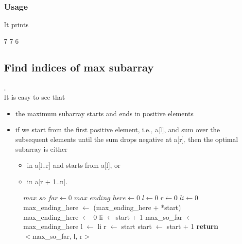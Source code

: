 \subsubsection{Usage}

It prints 
\begin{boxedverbatim}
7
7
6
\end{boxedverbatim}

\subsection{Find indices of max subarray}
\qquad {}.
\vspace{1mm}\\
It is easy to see that 
\begin{itemize}
    \item the maximum subarray  starts and ends in positive elements
    \item if we start from the first positive element, i.e., a[l], and sum over the subsequent elements until the sum drops negative at a[r], then the optimal subarray is either
    \begin{itemize}
        \item in a[l..r] and starts from a[l], or 
        \item in a[r + 1..n].
    \end{itemize}
\end{itemize}

\begin{figure}[H]
\begin{center}
\end{center}
\begin{algorithmic}[1]
    \State $max\_so\_far \gets 0$
    \State $max\_ending\_here \gets 0$
    \State $l \gets 0$
    \State $r \gets 0$
    \State $li \gets 0$
            \State max\_ending\_here  $\gets$ (max\_ending\_here + *start)
                \State max\_ending\_here $\gets$ 0
                \State li $\gets$start + 1
            \EndIf
               \State max\_so\_far $\gets$ max\_ending\_here
               \State l $\gets$ li
               \State r $\gets$ start
            \EndIf
            \State start $\gets$ start + 1
        \EndWhile
    \State \textbf{return} $<$max\_so\_far, l, r$>$
\EndFunction
\end{algorithmic}
\end{figure}

